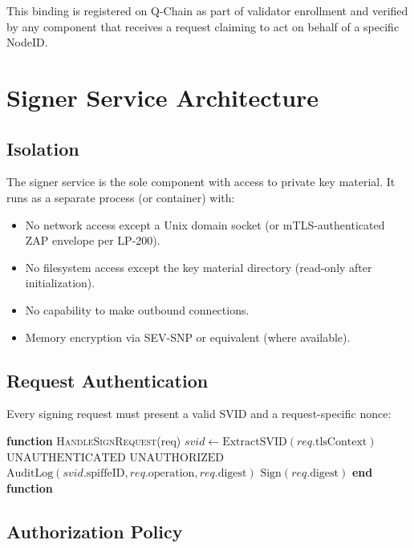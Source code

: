 \documentclass[11pt]{article}
\begin{document}
This binding is registered on Q-Chain as part of validator enrollment and verified by any component that receives a request claiming to act on behalf of a specific NodeID.

\section{Signer Service Architecture}

\subsection{Isolation}

The signer service is the sole component with access to private key material. It runs as a separate process (or container) with:
\begin{itemize}
\item No network access except a Unix domain socket (or mTLS-authenticated ZAP envelope per LP-200).
\item No filesystem access except the key material directory (read-only after initialization).
\item No capability to make outbound connections.
\item Memory encryption via SEV-SNP or equivalent (where available).
\end{itemize}

\subsection{Request Authentication}

Every signing request must present a valid SVID and a request-specific nonce:

\begin{algorithmic}[1]
\State \textbf{function} \textsc{HandleSignRequest}(req)
\State $svid \gets \text{ExtractSVID}(req.\text{tlsContext})$
    \State \Return $\text{UNAUTHENTICATED}$
\EndIf
{}
    \State \Return $\text{UNAUTHORIZED}$
\EndIf
\State $\text{AuditLog}(svid.\text{spiffeID}, req.\text{operation}, req.\text{digest})$
\State \Return $\text{Sign}(req.\text{digest})$
\State \textbf{end function}
\end{algorithmic}

\subsection{Authorization Policy}
\end{document}
